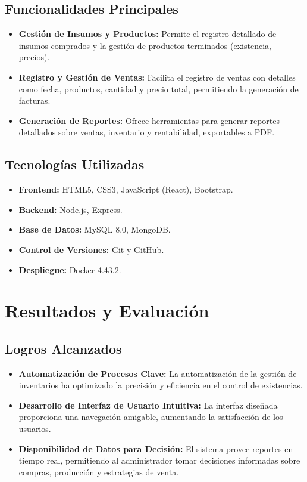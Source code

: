 \documentclass[conference]{IEEEtran}
\begin{document}
\subsection{Funcionalidades Principales}
\begin{itemize}
    \item \textbf{Gestión de Insumos y Productos:} Permite el registro detallado de insumos comprados y la gestión de productos terminados (existencia, precios).
    \item \textbf{Registro y Gestión de Ventas:} Facilita el registro de ventas con detalles como fecha, productos, cantidad y precio total, permitiendo la generación de facturas.
    \item \textbf{Generación de Reportes:} Ofrece herramientas para generar reportes detallados sobre ventas, inventario y rentabilidad, exportables a PDF.
\end{itemize}

\subsection{Tecnologías Utilizadas}
\begin{itemize}
    \item \textbf{Frontend:} HTML5, CSS3, JavaScript (React), Bootstrap.
    \item \textbf{Backend:} Node.js, Express.
    \item \textbf{Base de Datos:} MySQL 8.0, MongoDB.
    \item \textbf{Control de Versiones:} Git y GitHub.
    \item \textbf{Despliegue:} Docker 4.43.2.
\end{itemize}

\section{Resultados y Evaluación}
\subsection{Logros Alcanzados}
\begin{itemize}
    \item \textbf{Automatización de Procesos Clave:} La automatización de la gestión de inventarios ha optimizado la precisión y eficiencia en el control de existencias.
    \item \textbf{Desarrollo de Interfaz de Usuario Intuitiva:} La interfaz diseñada proporciona una navegación amigable, aumentando la satisfacción de los usuarios.
    \item \textbf{Disponibilidad de Datos para Decisión:} El sistema provee reportes en tiempo real, permitiendo al administrador tomar decisiones informadas sobre compras, producción y estrategias de venta.
\end{itemize}
\end{document}
